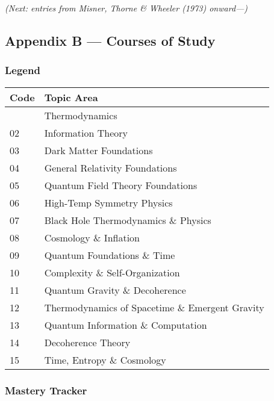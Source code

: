 \documentclass[
]{article}
\begin{document}
\emph{(Next: entries from Misner, Thorne \& Wheeler (1973) onward---)}

\subsection{Appendix B --- Courses of
Study}\label{appendix-b-courses-of-study}

\subsubsection{Legend}\label{legend}

\begin{longtable}[]{@{}ll@{}}
\toprule\noalign{}
Code & Topic Area \\
\midrule\noalign{}
\endhead
\bottomrule\noalign{}
\endlastfoot
01 & Thermodynamics \\
02 & Information Theory \\
03 & Dark Matter Foundations \\
04 & General Relativity Foundations \\
05 & Quantum Field Theory Foundations \\
06 & High-Temp Symmetry Physics \\
07 & Black Hole Thermodynamics \& Physics \\
08 & Cosmology \& Inflation \\
09 & Quantum Foundations \& Time \\
10 & Complexity \& Self-Organization \\
11 & Quantum Gravity \& Decoherence \\
12 & Thermodynamics of Spacetime \& Emergent Gravity \\
13 & Quantum Information \& Computation \\
14 & Decoherence Theory \\
15 & Time, Entropy \& Cosmology \\
\end{longtable}

\subsubsection{Mastery Tracker}\label{mastery-tracker}
\end{document}
